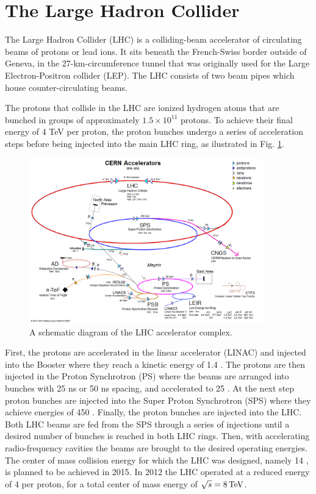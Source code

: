 \section{The Large Hadron Collider}

The Large Hadron Collider (LHC) \cite{Evans:2008zzb,Bruning:2004ej} is a colliding-beam accelerator 
of circulating beams of protons
or lead ions. 
It sits beneath the French-Swiss border outside of Geneva, in the 27-km-circumference tunnel that was originally used
for the Large Electron-Positron collider (LEP). 
 The LHC consists of two beam pipes which house counter-circulating beams.

The protons that collide in the LHC are ionized hydrogen atoms that are bunched in groups
of approximately $1.5\times10^{11}$ protons. To achieve their final energy of 4 TeV per proton,
the proton bunches undergo a series of acceleration steps before being injected into
the main LHC ring, as ilustrated in Fig. \ref{fig:accelerators}.

\begin{figure}[htbp]
\centering
\includegraphics[width=0.9\textwidth]{plots/intro/accelerators.png}
\caption{A schematic diagram of the LHC accelerator complex.\label{fig:accelerators}}
\end{figure}

First, the protons are accelerated in the linear accelerator (LINAC) and injected into 
the Booster where they reach a kinetic energy of 1.4 \GeV. The protons are then injected
in the Proton Synchrotron (PS) where the beams are arranged into bunches
with 25 ns or 50 ns spacing, and accelerated to 25 \GeV. At the next step
 proton bunches are injected
into the Super Proton Synchrotron (SPS) where they achieve energies of 450 \GeV. Finally, the proton
bunches are injected into the LHC. Both LHC beams are fed from the SPS through a series of injections
until a desired number of bunches is reached in both LHC rings. Then, with accelerating 
radio-frequency cavities the beams are brought to the desired operating energies.
The center of mass collision energy for which the LHC was designed, namely 14 \TeV,
 is planned to be achieved in 2015.
In 2012 the LHC operated at a reduced energy of 4 \TeV per proton, for a total
center of mass energy of $\sqrt{s} = 8 \,\text{Te\hspace{-.08em}V}$.

